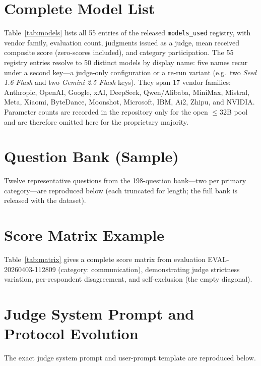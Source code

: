 \documentclass{article}
\begin{document}
\appendix
\section{Complete Model List}
\label{app:models}

Table~\ref{tab:models} lists all 55 entries of the released \texttt{models\_used} registry, with vendor family, evaluation count, judgments issued as a judge, mean received composite score (zero-scores included), and category participation. The 55 registry entries resolve to 50 distinct models by display name: five names recur under a second key---a judge-only configuration or a re-run variant (e.g.\ two \emph{Seed 1.6 Flash} and two \emph{Gemini 2.5 Flash} keys). They span 17 vendor families: Anthropic, OpenAI, Google, xAI, DeepSeek, Qwen/Alibaba, MiniMax, Mistral, Meta, Xiaomi, ByteDance, Moonshot, Microsoft, IBM, Ai2, Zhipu, and NVIDIA. Parameter counts are recorded in the repository only for the open $\leq$32B pool and are therefore omitted here for the proprietary majority.



\section{Question Bank (Sample)}

Twelve representative questions from the 198-question bank---two per primary category---are reproduced below (each truncated for length; the full bank is released with the dataset).



\section{Score Matrix Example}

Table~\ref{tab:matrix} gives a complete score matrix from evaluation EVAL-20260403-112809 (category: communication), demonstrating judge strictness variation, per-respondent disagreement, and self-exclusion (the empty diagonal).



\section{Judge System Prompt and Protocol Evolution}

The exact judge system prompt and user-prompt template are reproduced below.
\end{document}
